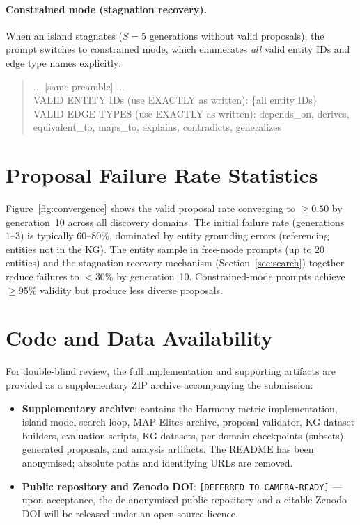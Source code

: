 \paragraph{Constrained mode (stagnation recovery).}
When an island stagnates ($S = 5$ generations without valid proposals), the
prompt switches to constrained mode, which enumerates \emph{all} valid entity
IDs and edge type names explicitly:
\begin{quote}\small\ttfamily
... [same preamble] ...\\[4pt]
VALID ENTITY IDs (use EXACTLY as written): \{all entity IDs\}\\
VALID EDGE TYPES (use EXACTLY as written): depends\_on, derives, equivalent\_to,
maps\_to, explains, contradicts, generalizes
\end{quote}

\section{Proposal Failure Rate Statistics}\label{app:failure-rate}

Figure~\ref{fig:convergence} shows the valid proposal rate converging to
$\geq 0.50$ by generation~10 across all discovery domains.  The initial failure
rate (generations 1--3) is typically 60--80\%, dominated by entity grounding
errors (referencing entities not in the KG).  The entity sample in free-mode
prompts (up to 20 entities) and the stagnation recovery mechanism
(Section~\ref{sec:search}) together reduce failures to $<$30\% by generation~10.
Constrained-mode prompts achieve $\geq$95\% validity but produce less diverse
proposals.

\section{Code and Data Availability}\label{app:code-data}

For double-blind review, the full implementation and supporting artifacts
are provided as a supplementary ZIP archive accompanying the submission:
\begin{itemize}[nosep]
  \item \textbf{Supplementary archive}: contains the Harmony metric
    implementation, island-model search loop, MAP-Elites archive,
    proposal validator, KG dataset builders, evaluation scripts,
    KG datasets, per-domain checkpoints (subsets), generated proposals,
    and analysis artifacts.  The README has been anonymised; absolute
    paths and identifying URLs are removed.
  \item \textbf{Public repository and Zenodo DOI}:
    \texttt{[DEFERRED TO CAMERA-READY]} --- upon acceptance, the
    de-anonymised public repository and a citable Zenodo DOI will be
    released under an open-source licence.
\end{itemize}

